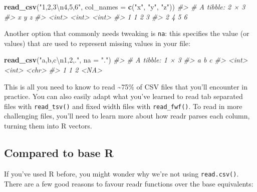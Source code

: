 \documentclass[]{book}
\newenvironment{Shaded}{\begin{snugshade}}{\end{snugshade}}
\newcommand{\KeywordTok}[1]{\textcolor[rgb]{0.13,0.29,0.53}{\textbf{{#1}}}}
\newcommand{\DataTypeTok}[1]{\textcolor[rgb]{0.13,0.29,0.53}{{#1}}}
\newcommand{\CharTok}[1]{\textcolor[rgb]{0.31,0.60,0.02}{{#1}}}
\newcommand{\StringTok}[1]{\textcolor[rgb]{0.31,0.60,0.02}{{#1}}}
\newcommand{\CommentTok}[1]{\textcolor[rgb]{0.56,0.35,0.01}{\textit{{#1}}}}
\newcommand{\NormalTok}[1]{{#1}}
\begin{document}
\begin{enumerate}
\begin{Shaded}
\begin{Highlighting}[]
\KeywordTok{read_csv}\NormalTok{(}\StringTok{"1,2,3}\CharTok{\textbackslash{}n}\StringTok{4,5,6"}\NormalTok{, }\DataTypeTok{col_names =} \KeywordTok{c}\NormalTok{(}\StringTok{"x"}\NormalTok{, }\StringTok{"y"}\NormalTok{, }\StringTok{"z"}\NormalTok{))}
\CommentTok{#> # A tibble: 2 × 3}
\CommentTok{#>       x     y     z}
\CommentTok{#>   <int> <int> <int>}
\CommentTok{#> 1     1     2     3}
\CommentTok{#> 2     4     5     6}
\end{Highlighting}
\end{Shaded}
\end{enumerate}

Another option that commonly needs tweaking is \texttt{na}: this
specifies the value (or values) that are used to represent missing
values in your file:

\begin{Shaded}
\begin{Highlighting}[]
\KeywordTok{read_csv}\NormalTok{(}\StringTok{"a,b,c}\CharTok{\textbackslash{}n}\StringTok{1,2,."}\NormalTok{, }\DataTypeTok{na =} \StringTok{"."}\NormalTok{)}
\CommentTok{#> # A tibble: 1 × 3}
\CommentTok{#>       a     b     c}
\CommentTok{#>   <int> <int> <chr>}
\CommentTok{#> 1     1     2  <NA>}
\end{Highlighting}
\end{Shaded}

This is all you need to know to read \textasciitilde{}75\% of CSV files
that you'll encounter in practice. You can also easily adapt what you've
learned to read tab separated files with \texttt{read\_tsv()} and fixed
width files with \texttt{read\_fwf()}. To read in more challenging
files, you'll need to learn more about how readr parses each column,
turning them into R vectors.

\subsection{Compared to base R}\label{compared-to-base-r}

If you've used R before, you might wonder why we're not using
\texttt{read.csv()}. There are a few good reasons to favour readr
functions over the base equivalents:
\end{document}
